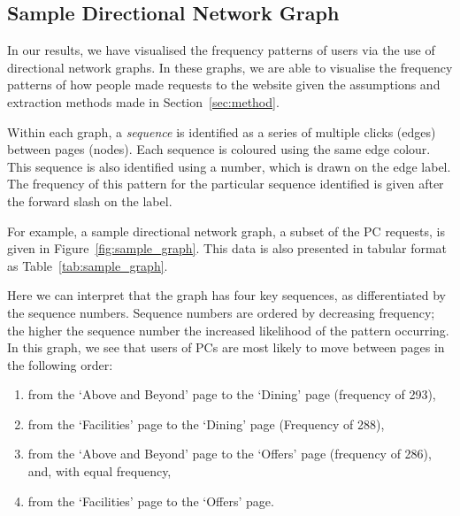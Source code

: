 \subsection{Sample Directional Network Graph}
\label{sec:results:sample_graph}

In our results, we have visualised the frequency patterns of users via the use of directional network graphs. In these graphs, we are able to visualise the frequency patterns of how people made requests to the website given the assumptions and extraction methods made in Section~\ref{sec:method}.

Within each graph, a \textit{sequence} is identified as a series of multiple clicks (edges) between pages (nodes). Each sequence is coloured using the same edge colour. This sequence is also identified using a number, which is drawn on the edge label. The frequency of this pattern for the particular sequence identified is given after the forward slash on the label.

For example, a sample directional network graph, a subset of the PC requests, is given in Figure~\ref{fig:sample_graph}. This data is also presented in tabular format as Table~\ref{tab:sample_graph}.

Here we can interpret that the graph has four key sequences, as differentiated by the sequence numbers. Sequence numbers are ordered by decreasing frequency; the higher the sequence number the increased likelihood of the pattern occurring. In this graph, we see that users of PCs are most likely to move between pages in the following order:

\begin{enumerate}
  \item from the `Above and Beyond' page to the `Dining' page (frequency of 293),
  \item from the `Facilities' page to the `Dining' page (Frequency of 288),
  \item from the `Above and Beyond' page to the `Offers' page (frequency of 286), and, with equal frequency,
  \item from the `Facilities' page to the `Offers' page.
\end{enumerate} 

\newpage


